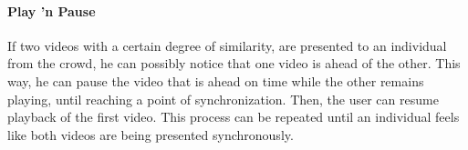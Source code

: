 \paragraph{Play 'n Pause}
If two videos with a certain degree of similarity, are presented to an individual from the crowd, he can possibly notice that one video is ahead of the other. This way, he can pause the video that is ahead on time while the other remains playing, until reaching a point of synchronization. Then, the user can resume playback of the first video. This process can be repeated until an individual feels like both videos are being presented synchronously.